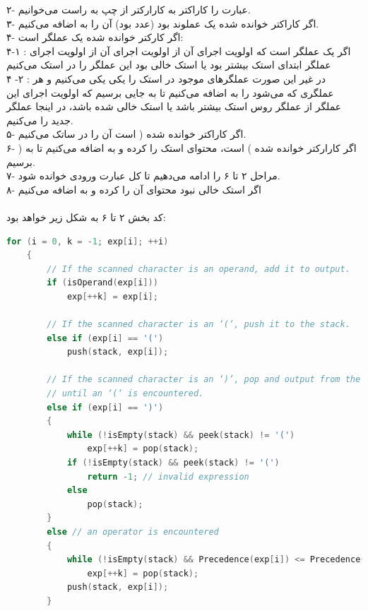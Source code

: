 \documentclass{article}
\begin{document}
\begin{enumerate}
\begin{enumerate}
		۲- عبارت  را کاراکتر به کارارکتر از چپ به راست می‌خوانیم.\\
		۳- اگر کاراکتر خوانده شده یک عملوند بود (عدد بود) آن را به  اضافه می‌کنیم.\\
		۴- اگر کارکتر خوانده شده یک عملگر است:\\
			۴-۱ : اگر یک عملگر است که اولویت اجرای آن از اولویت اجرای آن از اولویت اجرای عملگر ابتدای استک بیشتر بود یا استک خالی بود این عملگر را در استک  می‌کنیم\\
			۴ -۲ : در غیر این صورت عملگر‌های موجود در استک را یکی یکی  می‌کنیم و هر عملگری که  می‌شود را به  اضافه می‌کنیم تا به جایی برسیم که اولویت اجرای این عملگر از عملگر روس استک بیشتر باشد یا استک خالی شده باشد، در اینجا عملگر جدید را  می‌کنیم. \\
		۵- اگر کاراکتر خوانده شده ( است آن را در ساتک  می‌کنیم. \\
		۶- اگر کارارکتر خوانده شده ) است، محتوای استک را  کرده و به  اضافه می‌کنیم تا به ( برسیم. \\
		۷- مراحل ۲ تا ۶ را ادامه می‌دهیم تا کل عبارت ورودی خوانده شود. \\
		۸- اگر استک خالی نبود محتوای آن را  کرده و به  اضافه می‌کنیم\\
		\\
		کد بخش ۲ تا ۶ به شکل زیر خواهد بود:

	\begin{latin}
	\begin{flushright}				
	\begin{lstlisting}[language=C++]
	for (i = 0, k = -1; exp[i]; ++i)
    {
        // If the scanned character is an operand, add it to output.
        if (isOperand(exp[i]))
            exp[++k] = exp[i];
         
        // If the scanned character is an ‘(‘, push it to the stack.
        else if (exp[i] == '(')
            push(stack, exp[i]);
         
        // If the scanned character is an ‘)’, pop and output from the stack 
        // until an ‘(‘ is encountered.
        else if (exp[i] == ')')
        {
            while (!isEmpty(stack) && peek(stack) != '(')
                exp[++k] = pop(stack);
            if (!isEmpty(stack) && peek(stack) != '(')
                return -1; // invalid expression             
            else
                pop(stack);
        }
        else // an operator is encountered
        {
            while (!isEmpty(stack) && Precedence(exp[i]) <= Precedence(peek(stack)))
                exp[++k] = pop(stack);
            push(stack, exp[i]);
        }
 

\end{lstlisting}
\end{flushright}
\end{latin}
\end{enumerate}
\end{enumerate}
\end{document}
